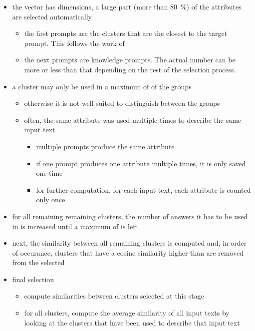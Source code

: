 \begin{itemize}
  \item the vector has \styleVectorSize{} dimensions, a large part (more than \SI{80}{\percent}) of the attributes are selected automatically
        \begin{itemize}
          \item the first \numTargetPrompts{} prompts are the clusters that are the closest to the target prompt. This follows the work of \citet{patelLearningInterpretableStyle2023}
          \item the next \minNumKnowledgePrompts{} prompts are knowledge prompts. The actual number can be more or less than that depending on the rest of the selection process. %
        \end{itemize}
  \item a cluster may only be used in a maximum of \clusterMaxGroupRatio{} of the groups
        \begin{itemize}
          \item otherwise it is not well suited to distinguish between the groups
          \item often, the same attribute was used multiple times to describe the same input text
                \begin{itemize}
                  \item multiple prompts produce the same attribute
                  \item if one prompt produces one attribute multiple times, it is only saved one time
                  \item for further computation, for each input text, each attribute is counted only once
                \end{itemize}
        \end{itemize}
  \item for all remaining remaining clusters, the number of answers it has to be used in is increased until a maximum of \maxClustersFirstSelection{} is left
  \item next, the similarity between all remaining clusters is computed and, in order of occurance, clusters that have a cosine similarity higher than \maxCosineSimilarity{} are removed from the selected
  \item final selection
        \begin{itemize}
          \item compute similarities between clusters selected at this stage
          \item for all clusters, compute the average similarity of all input texts by looking at the clusters that have been used to describe that input text

\end{itemize}
\end{itemize}
